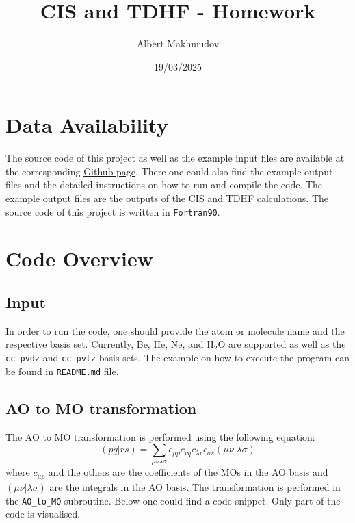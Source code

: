 \documentclass[12pt]{article}
\title{CIS and TDHF - Homework}
\author{Albert Makhmudov}
\date{19/03/2025}
\begin{document}
\maketitle

\section*{Data Availability}
The source code of this project as well as the example input files are available at the corresponding \href{https://github.com/almakhmudov/LTTC-Homework--CIS-TDHF}{Github page}. There one could also find the example output files and the detailed instructions on how to run and compile the code. The example output files are the outputs of the CIS and TDHF calculations. The source code of this project is written in \texttt{Fortran90}. \\

\section*{Code Overview}

\subsection*{Input}
In order to run the code, one should provide the atom or molecule name and the respective basis set. Currently, Be, He, Ne, and H$_{2}$O are supported as well as the \texttt{cc-pvdz} and \texttt{cc-pvtz} basis sets. The example on how to execute the program can be found in \texttt{README.md} file.

\subsection*{AO to MO transformation}
The AO to MO transformation is performed using the following equation:
\begin{equation}
    (pq|rs) = \sum_{\mu\nu\lambda\sigma} c_{\mu p} c_{\nu q} c_{\lambda r} c_{\sigma s} (\mu\nu|\lambda\sigma)
\end{equation}
where \(c_{\mu p}\) and the others are the coefficients of the MOs in the AO basis and \((\mu\nu|\lambda\sigma)\) are the integrals in the AO basis. The transformation is performed in the \texttt{AO\_to\_MO} subroutine. Below one could find a code snippet. Only part of the code is visualised.
\end{document}
